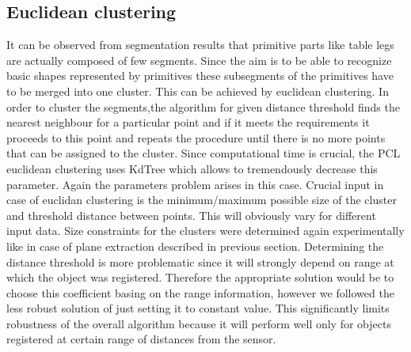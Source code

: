 \documentclass[fontsize=12pt]{article}
\begin{document}
\subsection{Euclidean clustering}
\indent It can be observed from segmentation results that primitive parts like table legs are actually composed of few segments. Since the aim is to be able to recognize basic shapes represented by primitives these subsegments of the primitives have to be merged into one cluster. This can be achieved by euclidean clustering.
\newline
\indent In order to cluster the segments,the algorithm for given distance threshold finds the nearest neighbour for a particular point and if it meets the requirements it proceeds to this point and repeats the procedure until there is no more points that can be assigned to the cluster. Since computational time is crucial, the PCL euclidean clustering uses KdTree which allows to tremendously decrease this parameter. 
Again the parameters problem arises in this case. Crucial input in case of euclidan clustering is the minimum/maximum possible size of the cluster and threshold distance between points. This will obviously vary for different input data. Size constraints for the clusters were determined again experimentally like in case of plane extraction described in previous section. Determining the distance threshold is more problematic since it will strongly depend on range at which the object was registered. Therefore the appropriate solution would be to choose this coefficient basing on the range information, however we followed the less robust solution of just setting it to constant value. This significantly limits robustness of the overall algorithm because it will perform well only for objects registered at certain range of distances from the sensor. 
\end{document}
